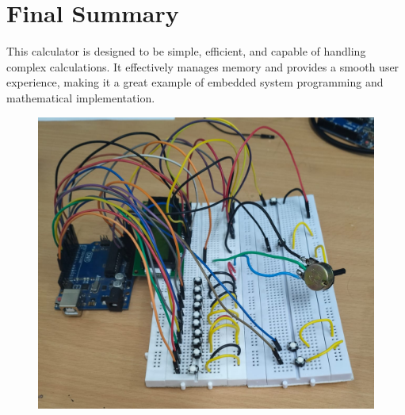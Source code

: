 \documentclass[journal]{IEEEtran}
\begin{document}
\section{Final Summary}
This calculator is designed to be simple, efficient, and capable of handling complex calculations. It effectively manages memory and provides a smooth user experience, making it a great example of embedded system programming and mathematical implementation.

\begin{figure}[h!]
   \centering
   \includegraphics[width=0.50\columnwidth]{figs/Calculator_connections.jpeg}
   \label{stemplot}
\end{figure}
\end{document}

